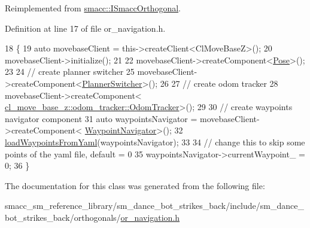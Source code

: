 Reimplemented from \hyperlink{classsmacc_1_1ISmaccOrthogonal_a6bb31c620cb64dd7b8417f8705c79c7a}{smacc\+::\+I\+Smacc\+Orthogonal}.



Definition at line 17 of file or\+\_\+navigation.\+h.


\begin{DoxyCode}
18     \{
19         \textcolor{keyword}{auto} movebaseClient = this->createClient<ClMoveBaseZ>();
20         movebaseClient->initialize();
21 
22         movebaseClient->createComponent<\hyperlink{classcl__move__base__z_1_1Pose}{Pose}>();
23 
24         \textcolor{comment}{// create planner switcher}
25         movebaseClient->createComponent<\hyperlink{classcl__move__base__z_1_1PlannerSwitcher}{PlannerSwitcher}>();
26 
27         \textcolor{comment}{// create odom tracker}
28         movebaseClient->createComponent<
      \hyperlink{classcl__move__base__z_1_1odom__tracker_1_1OdomTracker}{cl\_move\_base\_z::odom\_tracker::OdomTracker}>();
29 
30         \textcolor{comment}{// create waypoints navigator component}
31         \textcolor{keyword}{auto} waypointsNavigator = movebaseClient->createComponent<
      \hyperlink{classcl__move__base__z_1_1WaypointNavigator}{WaypointNavigator}>();
32         \hyperlink{classsm__dance__bot__strikes__back_1_1OrNavigation_abd8811831075be61ad28fe4a68fc738d}{loadWaypointsFromYaml}(waypointsNavigator);
33 
34         \textcolor{comment}{// change this to skip some points of the yaml file, default = 0}
35         waypointsNavigator->currentWaypoint\_ = 0;
36     \}
\end{DoxyCode}


The documentation for this class was generated from the following file\+:\begin{DoxyCompactItemize}
\item 
smacc\+\_\+sm\+\_\+reference\+\_\+library/sm\+\_\+dance\+\_\+bot\+\_\+strikes\+\_\+back/include/sm\+\_\+dance\+\_\+bot\+\_\+strikes\+\_\+back/orthogonals/\hyperlink{sm__dance__bot__strikes__back_2include_2sm__dance__bot__strikes__back_2orthogonals_2or__navigation_8h}{or\+\_\+navigation.\+h}\end{DoxyCompactItemize}
